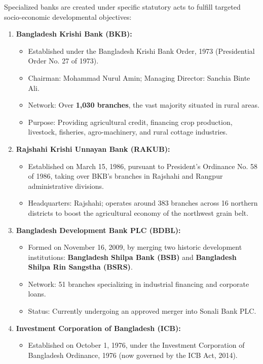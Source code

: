 Specialized banks are created under specific statutory acts to fulfill targeted socio-economic developmental objectives:

\begin{enumerate}
  \item \textbf{Bangladesh Krishi Bank (BKB):}
  \begin{itemize}
    \item Established under the Bangladesh Krishi Bank Order, 1973 (Presidential Order No. 27 of 1973).
    \item Chairman: Mohammad Nurul Amin; Managing Director: Sanchia Binte Ali.
    \item Network: Over \textbf{1,030 branches}, the vast majority situated in rural areas.
    \item Purpose: Providing agricultural credit, financing crop production, livestock, fisheries, agro-machinery, and rural cottage industries.
  \end{itemize}
  \item \textbf{Rajshahi Krishi Unnayan Bank (RAKUB):}
  \begin{itemize}
    \item Established on March 15, 1986, pursuant to President's Ordinance No. 58 of 1986, taking over BKB's branches in Rajshahi and Rangpur administrative divisions.
    \item Headquarters: Rajshahi; operates around 383 branches across 16 northern districts to boost the agricultural economy of the northwest grain belt.
  \end{itemize}
  \item \textbf{Bangladesh Development Bank PLC (BDBL):}
  \begin{itemize}
    \item Formed on November 16, 2009, by merging two historic development institutions: \textbf{Bangladesh Shilpa Bank (BSB)} and \textbf{Bangladesh Shilpa Rin Sangstha (BSRS)}.
    \item Network: 51 branches specializing in industrial financing and corporate loans.
    \item Status: Currently undergoing an approved merger into Sonali Bank PLC.
  \end{itemize}
  \item \textbf{Investment Corporation of Bangladesh (ICB):}
  \begin{itemize}
    \item Established on October 1, 1976, under the Investment Corporation of Bangladesh Ordinance, 1976 (now governed by the ICB Act, 2014).

\end{itemize}
\end{enumerate}
